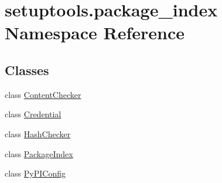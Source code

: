 \hypertarget{namespacesetuptools_1_1package__index}{}\section{setuptools.\+package\+\_\+index Namespace Reference}
\label{namespacesetuptools_1_1package__index}
\subsection*{Classes}
\begin{DoxyCompactItemize}
\item 
class \hyperlink{classsetuptools_1_1package__index_1_1ContentChecker}{Content\+Checker}
\item 
class \hyperlink{classsetuptools_1_1package__index_1_1Credential}{Credential}
\item 
class \hyperlink{classsetuptools_1_1package__index_1_1HashChecker}{Hash\+Checker}
\item 
class \hyperlink{classsetuptools_1_1package__index_1_1PackageIndex}{Package\+Index}
\item 
class \hyperlink{classsetuptools_1_1package__index_1_1PyPIConfig}{Py\+P\+I\+Config}
\end{DoxyCompactItemize}
